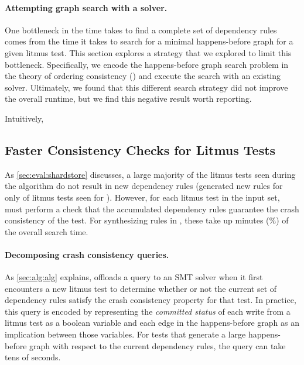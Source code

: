 \paragraph{Attempting graph search with a \tord solver.}
One bottleneck in the time \depsynth takes to find a complete set of
dependency rules comes from the time it takes to search for a minimal
happens-before graph for a given litmus test.
This section explores a strategy that we explored to limit this bottleneck.
Specifically, we encode the happens-before graph search problem
in the theory of ordering consistency (\tord)
and execute the search with an existing \tord solver.
Ultimately, we found that this different search strategy did not 
improve the overall runtime, but we find this negative
result worth reporting.


Intuitively, %

\subsection{Faster Consistency Checks for Litmus Tests}
\label{s:improved-search}
As \cref{sec:eval:shardstore} discusses,
a large majority of the litmus tests seen during the \depsynth
algorithm do not result in new dependency rules
(\depsynth generated new rules for only \shardstoretestsused of \shardstoreinputtests
 litmus tests seen for \shardstore).
However, for each litmus test in the input set, \depsynth
must perform a check that the accumulated dependency rules
guarantee the crash consistency of the test.
For synthesizing rules in \shardstore,
these take up \shardstoreverificationminutes minutes (\shardstoreverificationpercent\%)
of the overall search time.

\paragraph{Decomposing crash consistency queries.}
As \cref{sec:alg:alg} explains, \depsynth offloads a query to an SMT
solver when it first encounters a new litmus test to determine
whether or not the current set of dependency rules satisfy the
crash consistency property for that test.
In practice, this query is encoded by representing the \textit{committed status}
of each write from a litmus test as a boolean variable
and each edge in the happens-before graph as an implication between those variables.
For tests that generate a large happens-before graph
with respect to the current dependency rules,
the query can take tens of seconds.

